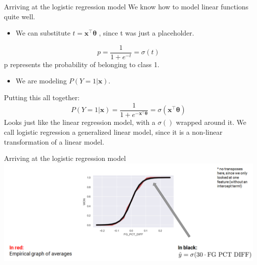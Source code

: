 \documentclass[aspectratio=169]{../latex_main/tntbeamer}  %
\begin{document}
	\begin{frame}{Arriving at the logistic regression model}
	    We know how to model linear functions quite well.\\
	    \begin{itemize}
	        \item We can substitute          $t = \bm{x}^\intercal\bm{\theta} $           , since t was just a placeholder.
	    \end{itemize}
	    \begin{equation*}
	        p = \frac{1}{1 + e^{-t}} = \sigma (t)
	    \end{equation*}
	    p represents the probability of belonging to class 1.
	    \begin{itemize}
	        \item We are modeling          $P(Y=1|\bm{x})$.
	    \end{itemize}
	    Putting this all together:
	    \begin{equation*}
	        P(Y=1|\bm{x}) = \frac{1}{1 + e^{-\bm{x}^\intercal\bm{\theta}}} = \sigma(\bm{x}^\intercal\bm{\theta})
	    \end{equation*}
	    Looks just like the linear regression model, with a $\sigma()$ wrapped around it.
We call logistic regression a generalized linear model, since it is a non-linear transformation of a linear model.

	\end{frame}
	
	\begin{frame}{Arriving at the logistic regression model}
	    \includegraphics[scale=.4]{Bild6}
	\end{frame}
	
\end{document}
